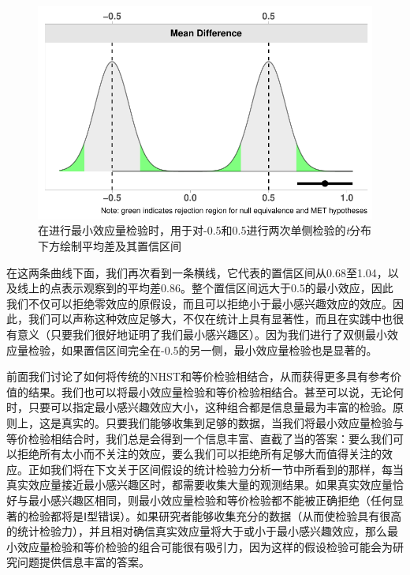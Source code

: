\documentclass[
  letterpaper,
  DIV=11,
  numbers=noendperiod]{scrreprt}
\begin{document}
\begin{figure}

{\centering \includegraphics[width=1\textwidth,height=\textheight]{09-equivalencetest_files/figure-pdf/fig-tmet-1.pdf}

}

\caption{\label{fig-tmet}在进行最小效应量检验时，用于对-0.5和0.5进行两次单侧检验的\emph{t}分布下方绘制平均差及其置信区间}

\end{figure}

在这两条曲线下面，我们再次看到一条横线，它代表的置信区间从0.68至1.04，以及线上的点表示观察到的平均差0.86。整个置信区间远大于0.5的最小效应，因此我们不仅可以拒绝零效应的原假设，而且可以拒绝小于最小感兴趣效应的效应。因此，我们可以声称这种效应足够大，不仅在统计上具有显著性，而且在实践中也很有意义（只要我们很好地证明了我们最小感兴趣区）。因为我们进行了双侧最小效应量检验，如果置信区间完全在-0.5的另一侧，最小效应量检验也是显著的。

前面我们讨论了如何将传统的NHST和等价检验相结合，从而获得更多具有参考价值的结果。我们也可以将最小效应量检验和等价检验相结合。甚至可以说，无论何时，只要可以指定最小感兴趣效应大小，这种组合都是信息量最为丰富的检验。原则上，这是真实的。只要我们能够收集到足够的数据，当我们将最小效应量检验与等价检验相结合时，我们总是会得到一个信息丰富、直截了当的答案：要么我们可以拒绝所有太小而不关注的效应，要么我们可以拒绝所有足够大而值得关注的效应。正如我们将在下文关于区间假设的统计检验力分析一节中所看到的那样，每当真实效应量接近最小感兴趣区时，都需要收集大量的观测结果。如果真实效应量恰好与最小感兴趣区相同，则最小效应量检验和等价检验都不能被正确拒绝（任何显著的检验都将是Ⅰ型错误）。如果研究者能够收集充分的数据（从而使检验具有很高的统计检验力），并且相对确信真实效应量将大于或小于最小感兴趣效应，那么最小效应量检验和等价检验的组合可能很有吸引力，因为这样的假设检验可能会为研究问题提供信息丰富的答案。
\end{document}
